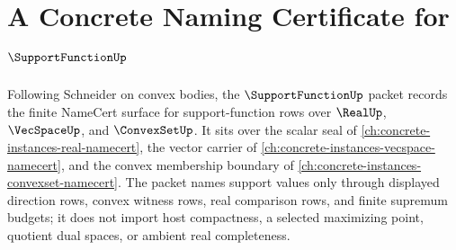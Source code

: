\chapter{A Concrete Naming Certificate for $\SupportFunctionUp$}
\label{ch:concrete-instances-support-function-namecert}

Following Schneider on convex bodies, the $\SupportFunctionUp$ packet records the finite NameCert surface for support-function rows over $\RealUp$, $\VecSpaceUp$, and $\ConvexSetUp$. It sits over the scalar seal of \autoref{ch:concrete-instances-real-namecert}, the vector carrier of \autoref{ch:concrete-instances-vecspace-namecert}, and the convex membership boundary of \autoref{ch:concrete-instances-convexset-namecert}. The packet names support values only through displayed direction rows, convex witness rows, real comparison rows, and finite supremum budgets; it does not import host compactness, a selected maximizing point, quotient dual spaces, or ambient real completeness.

